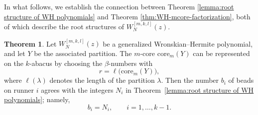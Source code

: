 \documentclass[preprint,3p,10pt]{elsarticle}
\theoremstyle{definition}
\newtheorem{theorem}{Theorem}[section]
\begin{document}
In what follows, we establish the connection between Theorem \ref{lemma:root structure of WH polynomials} and Theorem \ref{thm:WH-mcore-factorization}, both of which describe the root structures of $W_N^{[m,k,l]}(z)$.

\begin{theorem}\label{thm:relation between N_i and n_i}
Let \(W_N^{[m,k,l]}(z)\) be a generalized Wronskian--Hermite polynomial, and let \(Y\) be the associated partition. The \(m\)-core \(\mathrm{core}_m(Y)\) can be represented on the \(k\)-abacus by choosing the \(\beta\)-numbers with
\begin{equation}
r=\ell\bigl(\mathrm{core}_m(Y)\bigr),
\end{equation}
where $\ell(\lambda)$ denotes the length of the partition $\lambda$. 
Then the number \(b_i\) of beads on runner \(i\) agrees with the integers \(N_i\) in Theorem~\ref{lemma:root structure of WH polynomials}; namely,
\begin{equation}
b_i=N_i,\qquad i=1,\dots,k-1.
\end{equation}
\end{theorem}
\end{document}
